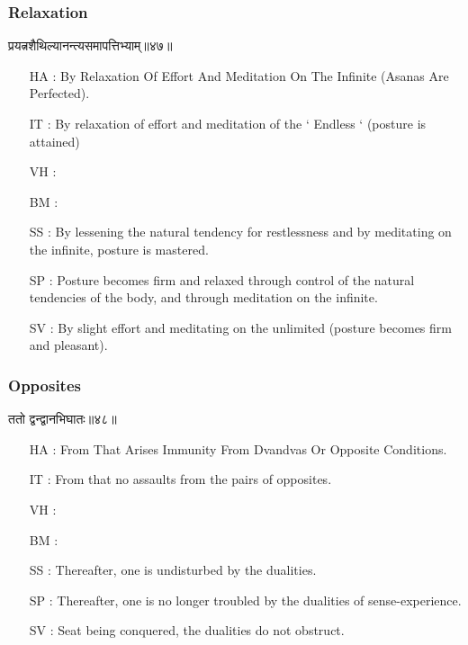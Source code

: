 \begin{frame}[fragile]\frametitle{Relaxation}
\begin{sanskrit}
प्रयत्नशैथिल्यानन्त्यसमापत्तिभ्याम्॥४७॥
\end{sanskrit}

	\begin{itemize}
	\item [HA]: By Relaxation Of Effort And Meditation On The Infinite (Asanas Are Perfected).
	\item [IT]: By relaxation of effort and meditation of the ‘ Endless ‘ (posture is attained)
	\item [VH]: 
	\item [BM]: 
	\item [SS]: By lessening the natural tendency for restlessness and by meditating on the infinite, posture is mastered.
	\item [SP]: Posture becomes firm and relaxed through control of the natural tendencies of the body, and through meditation on the infinite.
	\item [SV]: By slight effort and meditating on the unlimited (posture becomes firm and pleasant). 
	\end{itemize}
\end{frame}

\begin{frame}[fragile]\frametitle{Opposites}
\begin{sanskrit}
ततो द्वन्द्वानभिघातः॥४८॥
\end{sanskrit}

	\begin{itemize}
	\item [HA]: From That Arises Immunity From Dvandvas Or Opposite Conditions.
	\item [IT]: From that no assaults from the pairs of opposites.
	\item [VH]: 
	\item [BM]: 
	\item [SS]: Thereafter, one is undisturbed by the dualities.
	\item [SP]: Thereafter, one is no longer troubled by the dualities of sense-experience.
	\item [SV]: Seat being conquered, the dualities do not obstruct. 
	\end{itemize}
\end{frame}


